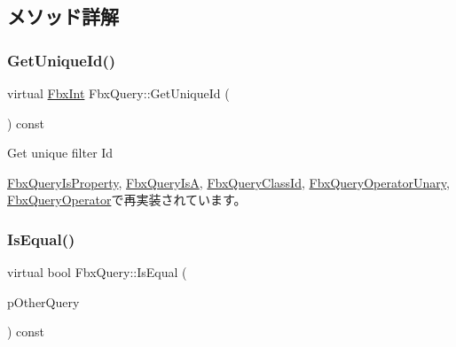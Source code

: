 \subsection{メソッド詳解}
\mbox{\label{class_fbx_query_ac7daae8f6fa83cd97ae24e93d7b4dc29}} 
\subsubsection{\texorpdfstring{Get\+Unique\+Id()}{GetUniqueId()}}
{\footnotesize\ttfamily virtual \hyperlink{fbxtypes_8h_a088fa96de3b0b3ea69f0f6afef525dfb}{Fbx\+Int} Fbx\+Query\+::\+Get\+Unique\+Id (\begin{DoxyParamCaption}{ }\end{DoxyParamCaption}) const\hspace{0.3cm}{\ttfamily [virtual]}}



Get unique filter Id 



\hyperlink{class_fbx_query_is_property_a390fb64587424e7d16cb4966566aee80}{Fbx\+Query\+Is\+Property}, \hyperlink{class_fbx_query_is_a_acf42ad6bd28bf6543ab09642561ee73b}{Fbx\+Query\+IsA}, \hyperlink{class_fbx_query_class_id_a9460258f2525b83b7e81f87a3bcc2c61}{Fbx\+Query\+Class\+Id}, \hyperlink{class_fbx_query_operator_unary_ac2e7dbfc697aee51db49db2857ab2b7c}{Fbx\+Query\+Operator\+Unary}, \hyperlink{class_fbx_query_operator_a55d021e0103b5e7dc0f8a80e4b468314}{Fbx\+Query\+Operator}で再実装されています。

\mbox{\label{class_fbx_query_adfc24c7306ceed2fcfd8c67198e0c1dd}} 
\subsubsection{\texorpdfstring{Is\+Equal()}{IsEqual()}}
{\footnotesize\ttfamily virtual bool Fbx\+Query\+::\+Is\+Equal (\begin{DoxyParamCaption}\item[{\hyperlink{class_fbx_query}{Fbx\+Query} $\ast$}]{p\+Other\+Query }\end{DoxyParamCaption}) const\hspace{0.3cm}{\ttfamily [virtual]}}

